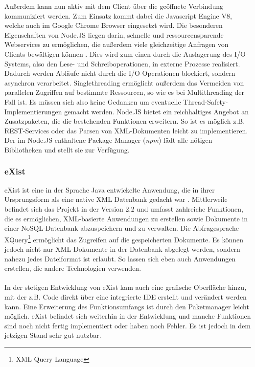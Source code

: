 Außerdem kann nun aktiv mit dem Client über die geöffnete Verbindung kommuniziert werden. Zum Einsatz kommt dabei die Javascript Engine V8, welche auch im Google Chrome Browser eingesetzt wird. Die besonderen Eigenschaften von Node.JS liegen darin, schnelle und ressourcensparende Webservices zu ermöglichen, die außerdem viele gleichzeitige Anfragen von Clients bewältigen können \cite{cantelon:nodejs}. Dies wird zum einen durch die Auslagerung des I/O-Systems, also den Lese- und Schreiboperationen, in externe Prozesse realisiert. Dadurch werden Abläufe nicht durch die I/O-Operationen blockiert, sondern asynchron verarbeitet. Singlethreading ermöglicht außerdem das Vermeiden von parallelen Zugriffen auf bestimmte Ressourcen, so wie es bei Multithreading der Fall ist. Es müssen sich also keine Gedanken um eventuelle Thread-Safety-Implementierungen gemacht werden. Node.JS bietet ein reichhaltiges Angebot an Zusatzpaketen, die die bestehenden Funktionen erweitern. So ist es möglich z.B. REST-Services oder das Parsen von XML-Dokumenten leicht zu implementieren. Der im Node.JS enthaltene Package Manager (\textit{npm}) lädt alle nötigen Bibliotheken und stellt sie zur Verfügung.

\subsubsection{eXist}
\label{subsec:eXist}
eXist \cite{existwebsite} ist eine in der Sprache Java entwickelte Anwendung, die in ihrer Ursprungsform als eine native XML Datenbank gedacht war \cite{siegel:exist}. Mittlerweile befindet sich das Projekt in der Version 2.2 und umfasst zahlreiche Funktionen, die es ermöglichen, XML-basierte Anwendungen zu erstellen sowie Dokumente in einer NoSQL-Datenbank abzuspeichern und zu verwalten. Die Abfragesprache XQuery\footnote[1]{XML Query Language} ermöglicht das Zugreifen auf die gespeicherten Dokumente. Es können jedoch nicht nur XML-Dokumente in der Datenbank abgelegt werden, sondern nahezu jedes Dateiformat ist erlaubt. So lassen sich eben auch Anwendungen erstellen, die andere Technologien verwenden.
\\
\\
In der stetigen Entwicklung von eXist kam auch eine grafische Oberfläche hinzu, mit der z.B. Code direkt über eine integrierte IDE erstellt und verändert werden kann. Eine Erweiterung des Funktionsumfangs ist durch den Paketmanager leicht möglich. eXist befindet sich weiterhin in der Entwicklung und manche Funktionen sind noch nicht fertig implementiert oder haben noch Fehler. Es ist jedoch in dem jetzigen Stand sehr gut nutzbar.

